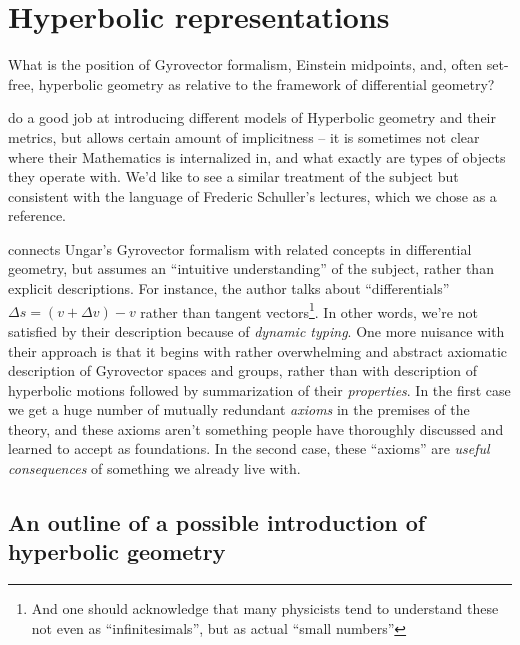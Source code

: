 \chapter{Hyperbolic representations }\label{chap:hyperbolics}

What is the position of Gyrovector formalism, Einstein midpoints, and, often
set-free, hyperbolic geometry as relative to the framework of differential
geometry?

\citet{beardonMindaHyp} do a good job at introducing different models of
Hyperbolic geometry and their metrics, but allows certain amount of
implicitness -- it is sometimes not clear where their Mathematics is
internalized in, and what exactly are types of objects they operate with. We'd
like to see a similar treatment of the subject but consistent with the language
of Frederic Schuller's lectures, which we chose as a reference.

\citet{ungarDiffGeom} connects Ungar's Gyrovector formalism with related
concepts in differential geometry, but assumes an ``intuitive understanding''
of the subject, rather than explicit descriptions. For instance, the author
talks about ``differentials'' \( \Delta s = (v + \Delta v) - v \) rather than
tangent vectors\footnote{And one should acknowledge that many physicists tend
to understand these not even as ``infinitesimals'', but as actual ``small
numbers''}. In other words, we're not satisfied by their description because of
\emph{dynamic typing}. One more nuisance with their approach is that it begins
with rather overwhelming and abstract axiomatic description of Gyrovector
spaces and groups, rather than with description of hyperbolic motions followed
by summarization of their \emph{properties}.  In the first case we get a huge
number of mutually redundant \emph{axioms} in the premises of the theory, and
these axioms aren't something people have thoroughly discussed and learned to
accept as foundations. In the second case, these ``axioms'' are \emph{useful
consequences} of something we already live with.

\section{An outline of a possible introduction of hyperbolic geometry}

